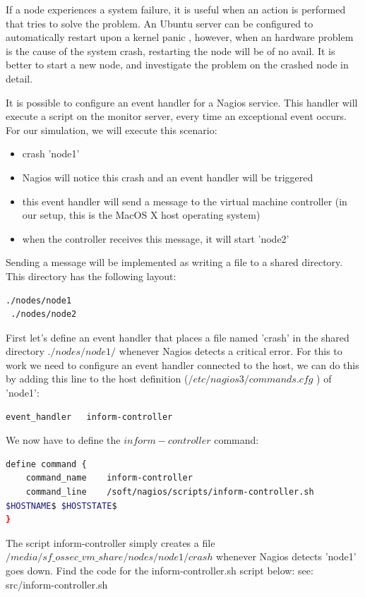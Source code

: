 \documentclass[12pt]{report}
\begin{document}
If a node experiences a system failure, it is useful when an action is
performed that tries to solve the problem. An Ubuntu server can be
configured to automatically restart upon a kernel panic
\cite{restart_upon_kernel_panic}, however, when an hardware problem is
the cause of the system crash, restarting the node will be of no
avail. It is better to start a new node, and investigate the problem
on the crashed node in detail.

It is possible to configure an event handler for a Nagios
service. This handler will execute a script on the monitor
server, every time an exceptional event occurs.
For our simulation, we will execute this scenario:
\begin{itemize}
\item crash 'node1'
\item Nagios will notice this crash and an event handler will be
  triggered
\item this event handler will send a message to the virtual machine
  controller (in our setup, this is the MacOS X host operating
  system)
\item when the controller receives this message, it will start 'node2'
\end{itemize}
Sending a message will be implemented as writing a file to a shared
directory. This directory has the following layout:
\begin{lstlisting}[language=bash]
 ./nodes/node1
 ./nodes/node2
\end{lstlisting} 
First let's define an event handler that places a file named 'crash' in the
shared directory $./nodes/node1/$ whenever Nagios detects a critical
error.
For this to work we need to configure an event handler connected to
the host, we can do this by adding this line to the host definition ($/etc/nagios3/commands.cfg$ ) of 'node1':
\begin{lstlisting}[language=bash]
event_handler   inform-controller
\end{lstlisting} 
We now have to define the $inform-controller$ command:
\begin{lstlisting}[language=bash]
define command {
    command_name    inform-controller
    command_line    /soft/nagios/scripts/inform-controller.sh
$HOSTNAME$ $HOSTSTATE$
}
\end{lstlisting} 
The script inform-controller simply creates a file
$/media/sf\_ossec\_vm\_share/nodes/node1/crash$ whenever Nagios
detects 'node1' goes down.
Find the code for the inform-controller.sh script below:
see: src/inform-controller.sh
\end{document}
